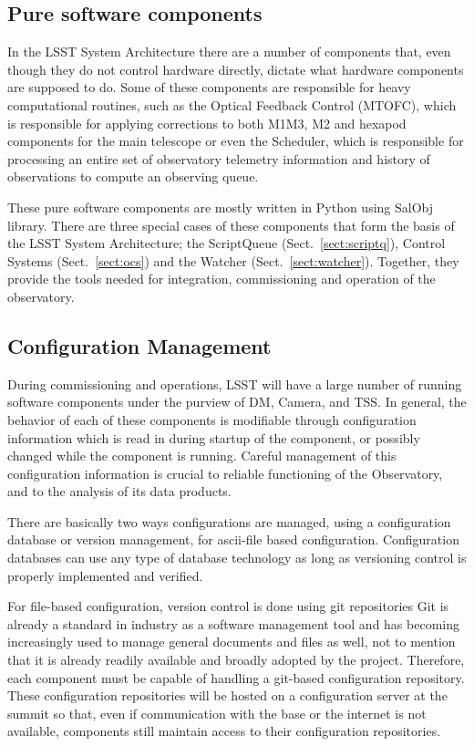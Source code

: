 \subsection{Pure software components}\label{sect:software_csc}
In the LSST System Architecture there are a number of components that, even though they do not control hardware directly, dictate 
what hardware components are supposed to do. Some of these components are responsible for heavy computational routines, 
such as the Optical Feedback Control (MTOFC), which is responsible for applying corrections to both M1M3, M2 and 
hexapod components for the main telescope or even the Scheduler, which is responsible for processing an entire set of 
observatory telemetry information and history of observations to compute an observing queue.

These pure software components are mostly written in Python using SalObj library. There are three special cases of these 
components that form the basis of the LSST System Architecture; the ScriptQueue (Sect.~\ref{sect:scriptq}), Control 
Systems (Sect.~\ref{sect:ocs}) and the Watcher (Sect.~\ref{sect:watcher}). Together, they provide the tools needed for 
integration, commissioning and operation of the observatory.

\subsection{Configuration Management}\label{sect:config}
During commissioning and operations, LSST will have a large number of running software components under the purview of DM, 
Camera, and TSS. In general, the behavior of each of these components is modifiable through configuration information which 
is read in during startup of the component, or possibly changed while the component is running. Careful management of 
this configuration information is crucial to reliable functioning of the Observatory, and to the analysis of its data products.

There are basically two ways configurations are managed, using a configuration database or version management, for 
ascii-file based configuration. Configuration databases can use any type of database technology as long as versioning 
control is properly implemented and verified. 

For file-based configuration, version control is done using git repositories
Git is already a standard in industry as a software management tool and has becoming increasingly used 
to manage general documents and files as well, not to mention that it is already readily available and broadly adopted by the 
project. Therefore, each component must be capable of handling a git-based configuration repository.
These configuration repositories will be hosted on a configuration server at the summit so that, even if communication with the 
base or the internet is not available, components still maintain access to their configuration repositories. 

